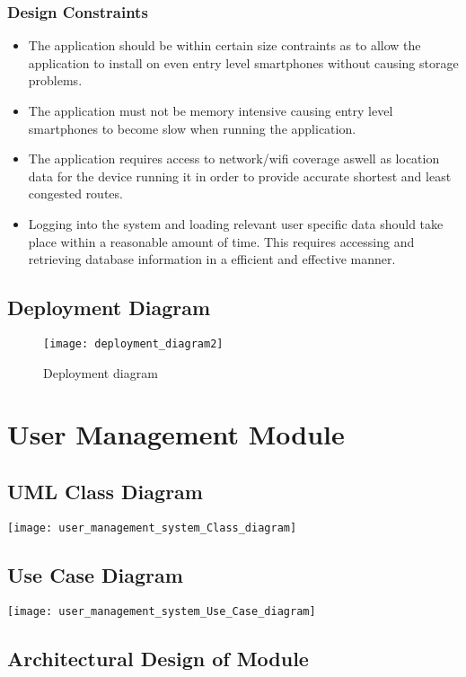 \documentclass{article}
\begin{document}
\subsubsection{Design Constraints}
\begin{itemize}
	\item The application should be within certain size contraints as to allow the application to 				install on even entry level smartphones without causing storage problems.
    \item The application must not be memory intensive causing entry level smartphones to become slow 			when running the application.
    \item The application requires access to network/wifi coverage aswell as location data for the 				device running it in order to provide accurate shortest and least congested routes.
    \item Logging into the system and loading relevant user specific data should take place within a 				reasonable amount of time. This requires accessing and retrieving database information in a 			efficient and effective manner.
\end{itemize}
\subsection{Deployment Diagram}

\pagebreak
\begin{figure}
\texttt{[image: deployment\_diagram2]}
\caption{Deployment diagram}
\end{figure}

\section{User Management Module}

\subsection{UML Class Diagram}
\texttt{[image: user\_management\_system\_Class\_diagram]}


\subsection{Use Case Diagram}

\texttt{[image: user\_management\_system\_Use\_Case\_diagram]}

\subsection{Architectural Design of Module}
\end{document}
